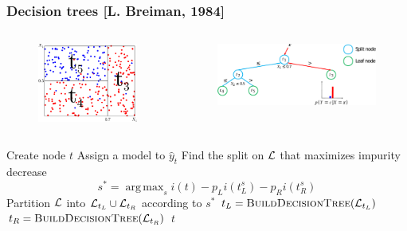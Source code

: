 \documentclass{beamer}
\DeclareMathOperator*{\argmax}{arg\,max}
\begin{document}
\begin{frame}[fragile]
    \frametitle{Decision trees [L. Breiman, 1984]}
    \begin{columns}
        \begin{column}{0.3\textwidth}
            \begin{figure}
            \includegraphics[width=\textwidth]{./figures/tree-partition-d.pdf}
            \end{figure}
        \end{column}
        \begin{column}{0.7\textwidth}
            \begin{figure}
            \includegraphics[width=\textwidth]{./figures/tree-simple.pdf}
            \end{figure}
        \end{column}
    \end{columns}

{\scriptsize
\begin{algorithmic}
    \State Create node $t$
        \State Assign a model to $\widehat{y}_t$
    \Else
        \State Find the split on ${\cal L}$ that maximizes impurity decrease $$s^* = \argmax_{s} i(t) - p_L i(t^s_L) - p_R i(t^s_R)$$
        \State Partition ${\cal L}$ into ${\cal L}_{t_L} \cup {\cal L}_{t_R}$ according to $s^*$
        \State $t_L = \Call{BuildDecisionTree}{{\cal L}_{t_L}}$
        \State $t_R = \Call{BuildDecisionTree}{{\cal L}_{t_R}}$
    \EndIf
    \State \Return $t$
\EndFunction
\end{algorithmic}
}

\end{frame}
\end{document}
